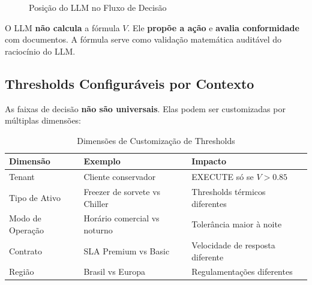 \documentclass[12pt, a4paper]{article}
\begin{document}
\begin{figure}[h!]
    \caption{Posição do LLM no Fluxo de Decisão}
    \label{fig:llm_flow}
\end{figure}

\begin{avisobox}[Importante]
O LLM \textbf{não calcula} a fórmula $V$. Ele \textbf{propõe a ação} e \textbf{avalia conformidade} com documentos. A fórmula serve como validação matemática auditável do raciocínio do LLM.
\end{avisobox}


\subsection{Thresholds Configuráveis por Contexto}

As faixas de decisão \textbf{não são universais}. Elas podem ser customizadas por múltiplas dimensões:

\begin{table}[h!]
\centering
\small
\begin{tabular}{|l|l|l|}
\hline
\textbf{Dimensão} & \textbf{Exemplo} & \textbf{Impacto} \\ \hline
Tenant & Cliente conservador & EXECUTE só se $V > 0.85$ \\ \hline
Tipo de Ativo & Freezer de sorvete vs Chiller & Thresholds térmicos diferentes \\ \hline
Modo de Operação & Horário comercial vs noturno & Tolerância maior à noite \\ \hline
Contrato & SLA Premium vs Basic & Velocidade de resposta diferente \\ \hline
Região & Brasil vs Europa & Regulamentações diferentes \\ \hline
\end{tabular}
\caption{Dimensões de Customização de Thresholds}
\end{table}
\end{document}
